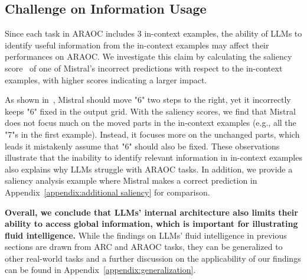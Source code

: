 \subsection{Challenge on Information Usage}
\label{sec:information usage}
Since each task in ARAOC includes 3 in-context examples, %
the ability of LLMs to identify useful information from the in-context examples may affect their performances on ARAOC. We investigate this claim by calculating the saliency score~\cite{simonyan2013deep} of one of Mistral's incorrect predictions with respect to the in-context examples, %
with higher scores indicating a larger impact. %


As shown in~, Mistral should move "6" two steps to the right, %
yet it incorrectly keeps "6" fixed in the output grid. %
With the saliency scores, we find that Mistral does not focus much on the moved parts in the in-context examples (e.g., all the "7"s in the first example). Instead, it focuses more on %
the unchanged parts, which leads it mistakenly assume that "6" should also be fixed. These observations illustrate that the inability to identify relevant information in in-context examples also explains why LLMs struggle with ARAOC tasks. In addition, we provide a saliency analysis example where Mistral makes a correct prediction in Appendix~\ref{appendix:additional saliency} for comparison.

\textbf{Overall, we conclude that LLMs' %
internal architecture also
limits their ability to access global information, which is important for illustrating fluid intelligence.
} While the findings on LLMs' fluid intelligence in previous sections are drawn from ARC and ARAOC tasks, they can be generalized to other real-world tasks and a further discussion on the applicability of our findings can be found in Appendix~\ref{appendix:generalization}.

